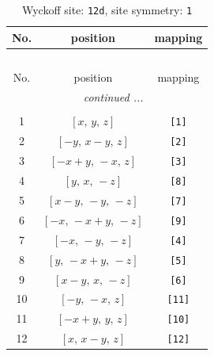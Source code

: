 \documentclass[fleqn,8pt]{jsarticle}
\begin{document}
\renewcommand{\arraystretch}{1.2}
\begin{longtable}{ccc}
\caption{Wyckoff site: {\tt 12d}, site symmetry: {\tt 1}}
 \\
 \hline \hline
No. & position & mapping \\ \hline \endfirsthead

\multicolumn{2}{l}{\tablename\ \thetable{}} \\
 \hline \hline
No. & position & mapping \\ \hline \endhead

 \hline \hline
\multicolumn{2}{r}{\footnotesize\it continued ...} \\ \endfoot

 \hline \hline
\multicolumn{2}{r}{} \\ \endlastfoot

1 & $\left[ x,\, y,\, z \right]$ & {\tt [1]} \\ \hline
2 & $\left[ - y,\, x - y,\, z \right]$ & {\tt [2]} \\ \hline
3 & $\left[ - x + y,\, - x,\, z \right]$ & {\tt [3]} \\ \hline
4 & $\left[ y,\, x,\, - z \right]$ & {\tt [8]} \\ \hline
5 & $\left[ x - y,\, - y,\, - z \right]$ & {\tt [7]} \\ \hline
6 & $\left[ - x,\, - x + y,\, - z \right]$ & {\tt [9]} \\ \hline
7 & $\left[ - x,\, - y,\, - z \right]$ & {\tt [4]} \\ \hline
8 & $\left[ y,\, - x + y,\, - z \right]$ & {\tt [5]} \\ \hline
9 & $\left[ x - y,\, x,\, - z \right]$ & {\tt [6]} \\ \hline
10 & $\left[ - y,\, - x,\, z \right]$ & {\tt [11]} \\ \hline
11 & $\left[ - x + y,\, y,\, z \right]$ & {\tt [10]} \\ \hline
12 & $\left[ x,\, x - y,\, z \right]$ & {\tt [12]} \\
\end{longtable}
\end{document}
